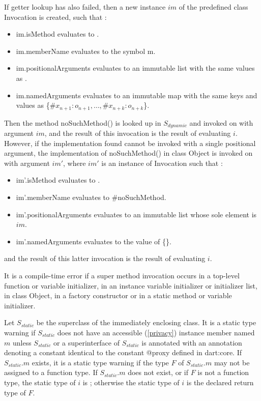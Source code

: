 \documentclass{article}
\newcommand{\code}[1]{{\sf #1}}
\begin{document}
\LMHash{}
If  getter lookup has also failed, then a new instance $im$  of the predefined class  \code{Invocation}  is created, such that :
\begin{itemize}
\item  \code{im.isMethod} evaluates to \code{\TRUE{}}.
\item  \code{im.memberName} evaluates to the symbol \code{m}.
\item \code{im.positionalArguments} evaluates to an immutable list with the same  values as  \code{[$o_1, \ldots, o_n$]}.
\item \code{im.namedArguments} evaluates to an immutable map with the same keys and values as \code{\{$\#x_{n+1}: o_{n+1}, \ldots, \#x_{n+k} : o_{n+k}$\}}.
\end{itemize}
Then the method \code{noSuchMethod()} is looked up in $S_{dynamic}$ and invoked on \THIS{} with argument $im$, and the result of this invocation is the result of evaluating $i$. However, if the implementation found cannot be invoked with a single positional argument, the implementation  of \code{noSuchMethod()} in class \code{Object} is invoked on \THIS{} with argument $im'$, where $im'$ is an instance of \code{Invocation} such that :
\begin{itemize}
\item  \code{im'.isMethod} evaluates to \code{\TRUE{}}.
\item  \code{im'.memberName} evaluates to \code{\#noSuchMethod}.
\item \code{im'.positionalArguments} evaluates to an immutable list whose sole element is  $im$.
\item \code{im'.namedArguments} evaluates to the value of \code{\CONST{} \{\}}.
\end{itemize}

and the result of this latter invocation is the result of evaluating $i$.


\LMHash{}
It is a compile-time error if a super method invocation occurs in a top-level function or variable initializer, in an instance variable initializer or initializer list, in class \code{Object}, in a factory constructor or in a static method or variable initializer.

\LMHash{}
Let $S_{static}$ be the superclass of the immediately enclosing class. It is a static type warning if $S_{static}$ does not have an accessible (\ref{privacy}) instance member named $m$ unless $S_{static}$ or a superinterface of $S_{static}$ is annotated with an annotation denoting a constant identical to the constant \code{@proxy} defined in \code{dart:core}. If $S_{static}.m$ exists, it  is a static type warning if the type $F$ of $S_{static}.m$ may not be assigned to a function type. If $S_{static}.m$ does not exist, or if $F$ is not a function type, the static type of $i$ is \DYNAMIC{}; otherwise the static type of $i$ is the declared return type of  $F$.
\end{document}
